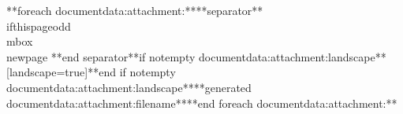 \documentclass{scrartcl}
\begin{document}

	
	\ifthispageodd{}{\mbox{}\newpage}

	**foreach documentdata:attachment:****separator**\\ifthispageodd{}{\\mbox{}\\newpage} **end separator**\*if notempty documentdata:attachment:landscape**[landscape=true]**end if notempty documentdata:attachment:landscape**{**generated documentdata:attachment:filename**}**end foreach documentdata:attachment:**
\end{document}
